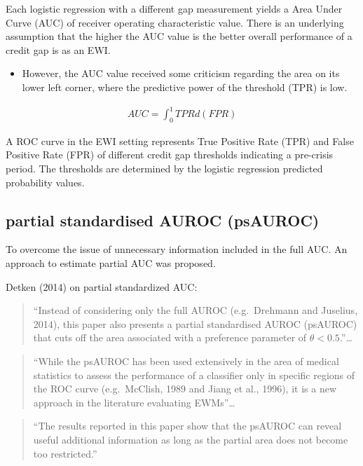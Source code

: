 \documentclass[
  12pt,
]{article}
\providecommand{\tightlist}{%
  \setlength{\itemsep}{0pt}\setlength{\parskip}{0pt}}
\begin{document}
Each logistic regression with a different gap measurement yields a Area Under Curve (AUC) of receiver operating characteristic value. There is an underlying assumption that the higher the AUC value is the better overall performance of a credit gap is as an EWI.

\begin{itemize}
\tightlist
\item
  However, the AUC value received some criticism regarding the area on its lower left corner, where the predictive power of the threshold (TPR) is low.
\end{itemize}

\begin{align*}
AUC = \int_0^1 TPR d(FPR)
\end{align*}

A ROC curve in the EWI setting represents True Positive Rate (TPR) and False Positive Rate (FPR) of different credit gap thresholds indicating a pre-crisis period. The thresholds are determined by the logistic regression predicted probability values.

\hypertarget{partial-standardised-auroc-psauroc}{%
\subsection{partial standardised AUROC (psAUROC)}\label{partial-standardised-auroc-psauroc}}

To overcome the issue of unnecessary information included in the full AUC. An approach to estimate partial AUC was proposed.

Detken (2014) on partial standardized AUC:

\begin{quote}
``Instead of considering only the full AUROC (e.g.~Drehmann and Juselius, 2014), this paper also presents a partial standardised AUROC (psAUROC) that cuts off the area associated with a preference parameter of \(\theta<0.5\).''\ldots{}
\end{quote}

\begin{quote}
``While the psAUROC has been used extensively in the area of medical statistics to assess the performance of a classifier only in specific regions of the ROC curve (e.g.~McClish, 1989 and Jiang et al., 1996), it is a new approach in the literature evaluating EWMs''\ldots{}
\end{quote}

\begin{quote}
``The results reported in this paper show that the psAUROC can reveal useful additional information as long as the partial area does not become too restricted.''
\end{quote}
\end{document}
